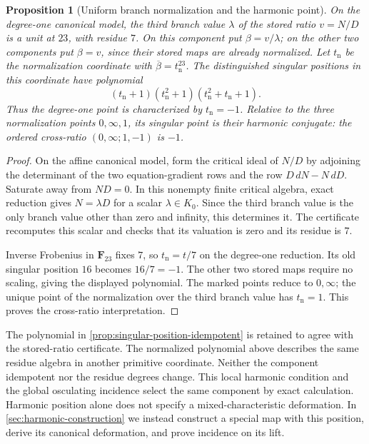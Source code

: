 \documentclass[11pt]{amsart}
\newtheorem{proposition}[proposition]{Proposition}
\theoremstyle{definition}
\theoremstyle{remark}
\newcommand{\FF}{\mathbf F}
\begin{document}
\begin{proposition}[Uniform branch normalization and the harmonic point]
\label{prop:harmonic-position}
On the degree-one canonical model, the third branch value $\lambda$
of the stored ratio $v=N/D$ is a unit at $23$, with residue $7$.
On this component put $\beta=v/\lambda$; on the other two components
put $\beta=v$, since their stored maps are already normalized.
Let $t_{\mathrm n}$ be the normalization coordinate with
$\overline\beta=t_{\mathrm n}^{23}$.
The distinguished singular positions in this coordinate have polynomial
\[
 (t_{\mathrm n}+1)(t_{\mathrm n}^2+1)
                  (t_{\mathrm n}^2+t_{\mathrm n}+1).
\]
Thus the degree-one point is characterized by $t_{\mathrm n}=-1$.
Relative to the three normalization points $0,\infty,1$,
its singular point is their harmonic conjugate:
the ordered cross-ratio $(0,\infty;1,-1)$ is $-1$.
\end{proposition}

\begin{proof}
On the affine canonical model, form the critical ideal of $N/D$
by adjoining the determinant of the two equation-gradient rows
and the row $D\,dN-N\,dD$.
Saturate away from $ND=0$.
In this nonempty finite critical algebra, exact reduction gives
$N=\lambda D$ for a scalar $\lambda\in K_0$.
Since the third branch value is the only branch value other than
zero and infinity, this determines it.
The certificate
recomputes this scalar and checks that its valuation is zero and
its residue is $7$.

Inverse Frobenius in $\FF_{23}$ fixes $7$, so
$t_{\mathrm n}=t/7$ on the degree-one reduction.
Its old singular position $16$ becomes $16/7=-1$.
The other two stored maps require no scaling, giving the displayed
polynomial.  The marked points reduce to $0,\infty$; the unique
point of the normalization over the third branch value has
$t_{\mathrm n}=1$.  This proves the cross-ratio interpretation.
\end{proof}

The polynomial in \cref{prop:singular-position-idempotent} is retained
to agree with the stored-ratio certificate.
The normalized polynomial above describes the same residue algebra
in another primitive coordinate.  Neither the component idempotent
nor the residue degrees change.
This local harmonic condition and the global osculating incidence
select the same component by exact calculation.
Harmonic position alone does not specify a mixed-characteristic
deformation.  In \cref{sec:harmonic-construction} we instead construct
a special map with this position, derive its canonical deformation,
and prove incidence on its lift.
\end{document}
